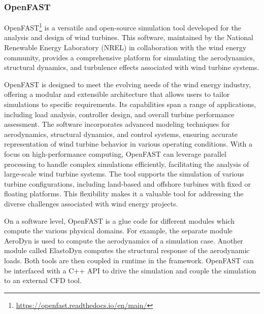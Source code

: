 \subsubsection{OpenFAST}

OpenFAST\footnote{\url{https://openfast.readthedocs.io/en/main/}} is a versatile and open-source simulation tool developed for the analysis and design of wind turbines. This software, maintained by the National Renewable Energy Laboratory (NREL) in collaboration with the wind energy community, provides a comprehensive platform for simulating the aerodynamics, structural dynamics, and turbulence effects associated with wind turbine systems.

OpenFAST is designed to meet the evolving needs of the wind energy industry, offering a modular and extensible architecture that allows users to tailor simulations to specific requirements. Its capabilities span a range of applications, including load analysis, controller design, and overall turbine performance assessment. The software incorporates advanced modeling techniques for aerodynamics, structural dynamics, and control systems, ensuring accurate representation of wind turbine behavior in various operating conditions. With a focus on high-performance computing, OpenFAST can leverage parallel processing to handle complex simulations efficiently, facilitating the analysis of large-scale wind turbine systems. The tool supports the simulation of various turbine configurations, including land-based and offshore turbines with fixed or floating platforms. This flexibility makes it a valuable tool for addressing the diverse challenges associated with wind energy projects.

On a software level, OpenFAST is a glue code for different modules which compute the various physical domains. For example, the separate module AeroDyn is used to compute the aerodynamics of a simulation case. Another module called ElastoDyn computes the structural response of the aerodynamic loads. Both tools are then coupled in runtime in the framework. OpenFAST can be interfaced with a C++ API to drive the simulation and couple the simulation to an external CFD tool.

